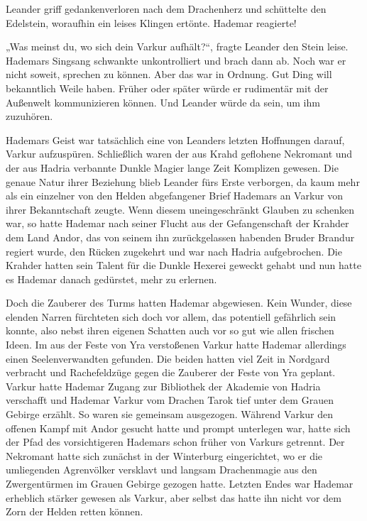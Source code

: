 Leander griff gedankenverloren nach dem Drachenherz und schüttelte den Edelstein, woraufhin ein leises Klingen ertönte. Hademar reagierte!

„Was meinst du, wo sich dein Varkur aufhält?“, fragte Leander den Stein leise. Hademars Singsang schwankte unkontrolliert und brach dann ab. Noch war er nicht soweit, sprechen zu können. Aber das war in Ordnung. Gut Ding will bekanntlich Weile haben. Früher oder später würde er rudimentär mit der Außenwelt kommunizieren können. Und Leander würde da sein, um ihm zuzuhören.

Hademars Geist war tatsächlich eine von Leanders letzten Hoffnungen darauf, Varkur aufzuspüren. Schließlich waren der aus Krahd geflohene Nekromant und der aus Hadria verbannte Dunkle Magier lange Zeit Komplizen gewesen. Die genaue Natur ihrer Beziehung blieb Leander fürs Erste verborgen, da kaum mehr als ein einzelner von den Helden abgefangener Brief Hademars an Varkur von ihrer Bekanntschaft zeugte. Wenn diesem uneingeschränkt Glauben zu schenken war, so hatte Hademar nach seiner Flucht aus der Gefangenschaft der Krahder dem Land Andor, das von seinem ihn zurückgelassen habenden Bruder Brandur regiert wurde, den Rücken zugekehrt und war nach Hadria aufgebrochen. Die Krahder hatten sein Talent für die Dunkle Hexerei geweckt gehabt und nun hatte es Hademar danach gedürstet, mehr zu erlernen.

Doch die Zauberer des Turms hatten Hademar abgewiesen. Kein Wunder, diese elenden Narren fürchteten sich doch vor allem, das potentiell gefährlich sein konnte, also nebst ihren eigenen Schatten auch vor so gut wie allen frischen Ideen. Im aus der Feste von Yra verstoßenen Varkur hatte Hademar allerdings einen Seelenverwandten gefunden. Die beiden hatten viel Zeit in Nordgard verbracht und Rachefeldzüge gegen die Zauberer der Feste von Yra geplant. Varkur hatte Hademar Zugang zur Bibliothek der Akademie von Hadria verschafft und Hademar Varkur vom Drachen Tarok tief unter dem Grauen Gebirge erzählt. So waren sie gemeinsam ausgezogen. Während Varkur den offenen Kampf mit Andor gesucht hatte und prompt unterlegen war, hatte sich der Pfad des vorsichtigeren Hademars schon früher von Varkurs getrennt. Der Nekromant hatte sich zunächst in der Winterburg eingerichtet, wo er die umliegenden Agrenvölker versklavt und langsam Drachenmagie aus den Zwergentürmen im Grauen Gebirge gezogen hatte. Letzten Endes war Hademar erheblich stärker gewesen als Varkur, aber selbst das hatte ihn nicht vor dem Zorn der Helden retten können.

